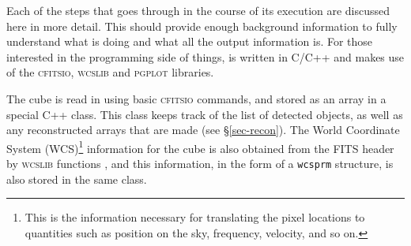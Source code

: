 %
%
%
%
\label{sec-flow}

Each of the steps that \duchamp goes through in the course of its
execution are discussed here in more detail. This should provide
enough background information to fully understand what \duchamp is
doing and what all the output information is. For those interested in
the programming side of things, \duchamp is written in C/C++ and makes
use of the \textsc{cfitsio}, \textsc{wcslib} and \textsc{pgplot}
libraries.

\label{sec-input}

The cube is read in using basic \textsc{cfitsio} commands, and stored
as an array in a special C++ class. This class keeps track of the list
of detected objects, as well as any reconstructed arrays that are made
(see \S\ref{sec-recon}). The World Coordinate System
(WCS)\footnote{This is the information necessary for translating the
pixel locations to quantities such as position on the sky, frequency,
velocity, and so on.} information for the cube is also obtained from
the FITS header by \textsc{wcslib} functions \citep{greisen02,
calabretta02}, and this information, in the form of a \texttt{wcsprm}
structure, is also stored in the same class.

